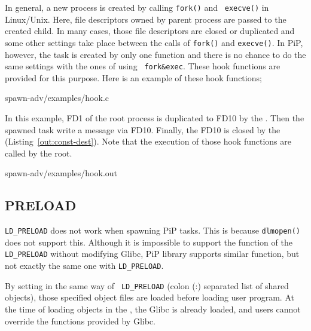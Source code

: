In general, a new process is created by calling {\tt fork()} and {\tt
execve()} in Linux/Unix. Here, file descriptors owned by
parent process are passed to the created child. In many cases, those
file descriptors are closed or duplicated and some other settings take
place between the calls of {\tt fork()} and {\tt execve()}. In PiP,
however, the task is created by only one function and there is no
chance to do the same settings with the ones of using {\tt
  fork\&exec}. These hook functions are provided for this purpose. Here 
is an example of these hook functions;  

 {spawn-adv/examples/hook.c}

In this example, FD1 of the root process is duplicated to FD10 by the
. Then the spawned task write a message via
FD10. Finally, the FD10 is closed by the 
(Listing~\ref{out:const-dest}). 
Note that the execution of those hook functions are called by the root. 


                {spawn-adv/examples/hook.out}

\subsection{PRELOAD}

{\tt LD_PRELOAD} does not work when spawning PiP tasks. This is
because {\tt dlmopen()} does not support this. Although it is
impossible to support the function of the {\tt LD_PRELOAD} without
modifying Glibc, PiP library supports similar function, but not
exactly the same one with  {\tt LD_PRELOAD}.

By setting  in the same way of {\tt
  LD_PRELOAD} (colon (:) separated list of shared objects), those
specified object files are loaded before loading user program. At the
time of loading objects in the , the Glibc is
already loaded, and users cannot override the 
functions provided by Glibc.
